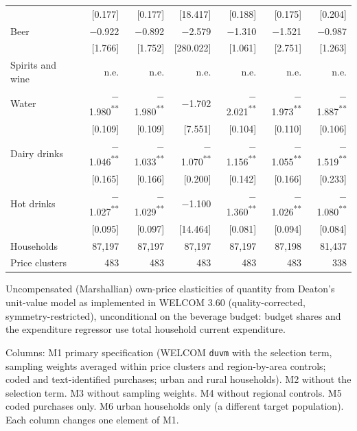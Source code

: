 \documentclass[
  11pt,
]{article}
\begin{document}
\begin{table}[!htbp]
\begin{threeparttable}
\begin{tabular}{lrrrrrr}
 & [0.177] & [0.177] & [18.417] & [0.188] & [0.175] & [0.204] \\
Beer & $-$0.922 & $-$0.892 & $-$2.579 & $-$1.310 & $-$1.521 & $-$0.987 \\
 & [1.766] & [1.752] & [280.022] & [1.061] & [2.751] & [1.263] \\
Spirits and wine & n.e. & n.e. & n.e. & n.e. & n.e. & n.e. \\
Water & $-$1.980\textsuperscript{**} & $-$1.980\textsuperscript{**} & $-$1.702 & $-$2.021\textsuperscript{**} & $-$1.973\textsuperscript{**} & $-$1.887\textsuperscript{**} \\
 & [0.109] & [0.109] & [7.551] & [0.104] & [0.110] & [0.106] \\
Dairy drinks & $-$1.046\textsuperscript{**} & $-$1.033\textsuperscript{**} & $-$1.070\textsuperscript{**} & $-$1.156\textsuperscript{**} & $-$1.055\textsuperscript{**} & $-$1.519\textsuperscript{**} \\
 & [0.165] & [0.166] & [0.200] & [0.142] & [0.166] & [0.233] \\
Hot drinks & $-$1.027\textsuperscript{**} & $-$1.029\textsuperscript{**} & $-$1.100 & $-$1.360\textsuperscript{**} & $-$1.026\textsuperscript{**} & $-$1.080\textsuperscript{**} \\
 & [0.095] & [0.097] & [14.464] & [0.081] & [0.094] & [0.084] \\
\addlinespace
Households & 87,197 & 87,197 & 87,197 & 87,197 & 87,198 & 81,437 \\
Price clusters & 483 & 483 & 483 & 483 & 483 & 338 \\
\bottomrule
\end{tabular}
\begin{tablenotes}[flushleft]
\footnotesize
\item Uncompensated (Marshallian) own-price elasticities of quantity from Deaton's unit-value model as implemented in WELCOM 3.60 (quality-corrected, symmetry-restricted), unconditional on the beverage budget: budget shares and the expenditure regressor use total household current expenditure.
\item Columns: M1 primary specification (WELCOM \texttt{duvm} with the selection term, sampling weights averaged within price clusters and region-by-area controls; coded and text-identified purchases; urban and rural households). M2 without the selection term. M3 without sampling weights. M4 without regional controls. M5 coded purchases only. M6 urban households only (a different target population). Each column changes one element of M1.

\end{tablenotes}
\end{threeparttable}
\end{table}
\end{document}
